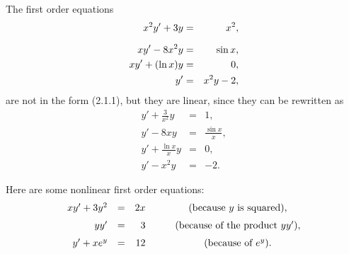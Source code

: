 \setcounter{example}{0}
\begin{example}
  \label{example:2.1.1}\rm The first order equations
  \begin{eqnarray*}
    x^{2}y'+3y   & = & x^{2},  \\[2\jot]
    xy'-8x^{2}y  & = & \sin x, \\
    xy'+(\ln x)y & = & 0,      \\
    y'           & = & x^{2}y-2,
  \end{eqnarray*}
  are not in the form \textup{(2.1.1)}, but they are linear, since they can be rewritten as
  \begin{eqnarray*}
    y'+\frac{3}{x^{2}}y & = & 1,                \\
    y'-8xy              & = & \frac{\sin x}{x}, \\
    y'+\frac{\ln x}{x}y & = & 0,                \\
    y'-x^{2}y           & = & -2.
  \end{eqnarray*}
\end{example}

\setcounter{example}{1}
\begin{example}
  \label{example:2.1.2}\rm Here are some nonlinear first order equations:
  \[
    \begin{array}{rcrc}
      xy'+3y^{2} & = & 2x & \qquad\mbox{(because $y$ is squared)},       \\[2\jot]
      yy'        & = & 3  & \qquad\mbox{(because of the product $yy'$)}, \\[2\jot]
      y'+xe^{y}  & = & 12 & \qquad\mbox{(because of $e^{y}$)}.
    \end{array}
  \]
\end{example}

